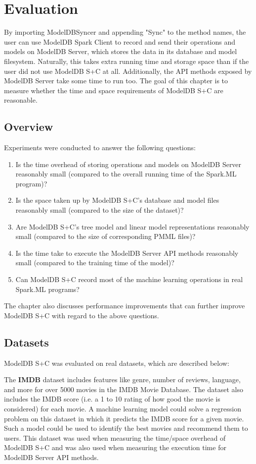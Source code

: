 \chapter{Evaluation}
By importing ModelDBSyncer and appending "Sync" to the method names, the user
can use ModelDB Spark Client to record and send their operations and models
on ModelDB Server, which stores the data in its database and model filesystem.
Naturally, this takes extra running time and storage space than if the user did
not use ModelDB S+C at all. Additionally, the API methods exposed by ModelDB Server
take some time to run too. The goal of this chapter is to measure whether the time
and space requirements of ModelDB S+C are reasonable.


\section{Overview}
Experiments were conducted to answer the following questions:

\begin{enumerate}
\item Is the time overhead of storing operations and models on ModelDB Server reasonably small (compared to
the overall running time of the Spark.ML program)?
\item Is the space taken up by ModelDB S+C's database and model files reasonably small (compared
to the size of the dataset)?
\item Are ModelDB S+C's tree model and linear model representations reasonably small (compared 
to the size of corresponding PMML files)?
\item Is the time take to execute the ModelDB Server API methods reasonably small (compared
to the training time of the model)?
\item Can ModelDB S+C record most of the machine learning operations in real Spark.ML programs?
\end{enumerate}

The chapter also discusses performance improvements that can further improve ModelDB S+C with
regard to the above questions.

\section{Datasets}
ModelDB S+C was evaluated on real datasets, which are described below:

The \textbf{IMDB} dataset \cite{imdb} includes features like genre, number of
reviews, language, and more for over 5000 movies in the IMDB Movie Database. The dataset
also includes the IMDB score (i.e. a 1 to 10 rating of how good the movie is considered)
for each movie. A machine learning model could solve a regression problem on this
dataset in which it predicts the IMDB score for a given movie. Such a model could
be used to identify the best movies and recommend them to users. This dataset
was used when measuring the time/space overhead of ModelDB S+C and was also used
when measuring the execution time for ModelDB Server API methods.

